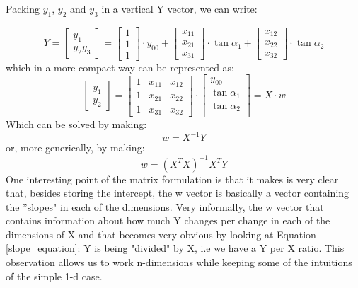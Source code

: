 Packing $y_1$, $y_2$ and $y_3$ in a vertical Y vector, we can write:

\begin{equation}
Y = \begin{bmatrix}
y_1 \\
y_2
y_3
\end{bmatrix}
=
\begin{bmatrix}
1 \\
1 \\
1
\end{bmatrix}
\cdot y_{00}
+
\begin{bmatrix}
x_{11} \\
x_{21} \\
x_{31}
\end{bmatrix}
\cdot 
\tan\alpha_1
+
\begin{bmatrix}
x_{12} \\
x_{22} \\
x_{32}
\end{bmatrix}
\cdot 
\tan\alpha_2
\label{equation_comb_of_dimension_vectors_2_dim}
\end{equation}
which in a more compact way can be represented as:
\begin{equation}
\begin{bmatrix}
y_1 \\
y_2
\end{bmatrix}
=
\begin{bmatrix}
1 & x_{11} & x_{12}\\
1 & x_{21} & x_{22}\\
1 & x_{31} & x_{32}
\end{bmatrix}
\cdot
\begin{bmatrix}
y_{00} \\ 
\tan\alpha_1 \\
\tan\alpha_2 \\
\end{bmatrix} = X \cdot w
\end{equation}
Which can be solved by making:
\begin{equation}
w = X^{-1} Y
\end{equation}
or, more generically, by making:
\begin{equation}
w = (X^T X)^{-1} X^T Y 
\end{equation}
One interesting point of the matrix formulation is that it makes is very clear that, besides storing the intercept, the w vector is basically a vector containing the ''slopes" in each of the dimensions. Very informally, the w vector that contains information about how much Y changes per change in each of the dimensions of X and that becomes very obvious by looking at Equation \ref{slope_equation}: Y is being "divided" by X, i.e we have a Y per X ratio. This observation allows us to work n-dimensions while keeping some of the intuitions of the simple 1-d case.

